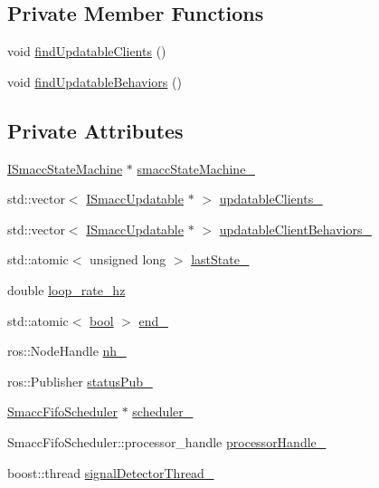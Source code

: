 \subsection*{Private Member Functions}
\begin{DoxyCompactItemize}
\item 
void \hyperlink{classsmacc_1_1SignalDetector_a47ec2df560e2e33758ce3975bece9385}{find\+Updatable\+Clients} ()
\item 
void \hyperlink{classsmacc_1_1SignalDetector_a7e1301b9d23a522f18385368421c83f5}{find\+Updatable\+Behaviors} ()
\end{DoxyCompactItemize}
\subsection*{Private Attributes}
\begin{DoxyCompactItemize}
\item 
\hyperlink{classsmacc_1_1ISmaccStateMachine}{I\+Smacc\+State\+Machine} $\ast$ \hyperlink{classsmacc_1_1SignalDetector_a46025de6ac7b5980e22144f9703236a4}{smacc\+State\+Machine\+\_\+}
\item 
std\+::vector$<$ \hyperlink{classsmacc_1_1ISmaccUpdatable}{I\+Smacc\+Updatable} $\ast$ $>$ \hyperlink{classsmacc_1_1SignalDetector_a36a702afabbc335cbdb1e8699b669323}{updatable\+Clients\+\_\+}
\item 
std\+::vector$<$ \hyperlink{classsmacc_1_1ISmaccUpdatable}{I\+Smacc\+Updatable} $\ast$ $>$ \hyperlink{classsmacc_1_1SignalDetector_a777b671ca6bbedd2fdc83f60f9ec8f83}{updatable\+Client\+Behaviors\+\_\+}
\item 
std\+::atomic$<$ unsigned long $>$ \hyperlink{classsmacc_1_1SignalDetector_a72293ed0e98f4200fbe75b53f1e41eab}{last\+State\+\_\+}
\item 
double \hyperlink{classsmacc_1_1SignalDetector_a41a2ae4262ed350f46d8b886bdc1dfa5}{loop\+\_\+rate\+\_\+hz}
\item 
std\+::atomic$<$ \hyperlink{classbool}{bool} $>$ \hyperlink{classsmacc_1_1SignalDetector_aaee266393c01693528a2d74b1f2354a2}{end\+\_\+}
\item 
ros\+::\+Node\+Handle \hyperlink{classsmacc_1_1SignalDetector_a5c416677fd537afc79f2fbc2e68b2dee}{nh\+\_\+}
\item 
ros\+::\+Publisher \hyperlink{classsmacc_1_1SignalDetector_ae065bbd4e699e5fce00fbc508dedd4c1}{status\+Pub\+\_\+}
\item 
\hyperlink{smacc__fifo__scheduler_8h_a0063e275231c80d5f97df21d17257bf7}{Smacc\+Fifo\+Scheduler} $\ast$ \hyperlink{classsmacc_1_1SignalDetector_adaee5b9b91d0e6305dc1ab30f7ab566d}{scheduler\+\_\+}
\item 
Smacc\+Fifo\+Scheduler\+::processor\+\_\+handle \hyperlink{classsmacc_1_1SignalDetector_a9a77dc9f0e9f8f56dff5e76077abcb78}{processor\+Handle\+\_\+}
\item 
boost\+::thread \hyperlink{classsmacc_1_1SignalDetector_a4346a400cd37eafc5d1d2e63d975785e}{signal\+Detector\+Thread\+\_\+}
\end{DoxyCompactItemize}



